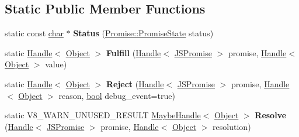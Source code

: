\subsection*{Static Public Member Functions}
\begin{DoxyCompactItemize}
\item 
\mbox{\label{classv8_1_1internal_1_1JSPromise_a06fe1942f92d4b54d2e3625027102922}} 
static const \mbox{\hyperlink{classchar}{char}} $\ast$ {\bfseries Status} (\mbox{\hyperlink{classv8_1_1Promise_a0c357b9d99a634f98a5a203b0a322544}{Promise\+::\+Promise\+State}} status)
\item 
\mbox{\label{classv8_1_1internal_1_1JSPromise_ae661a5f908aca0c05a78af29f0a615e0}} 
static \mbox{\hyperlink{classv8_1_1internal_1_1Handle}{Handle}}$<$ \mbox{\hyperlink{classv8_1_1internal_1_1Object}{Object}} $>$ {\bfseries Fulfill} (\mbox{\hyperlink{classv8_1_1internal_1_1Handle}{Handle}}$<$ \mbox{\hyperlink{classv8_1_1internal_1_1JSPromise}{J\+S\+Promise}} $>$ promise, \mbox{\hyperlink{classv8_1_1internal_1_1Handle}{Handle}}$<$ \mbox{\hyperlink{classv8_1_1internal_1_1Object}{Object}} $>$ value)
\item 
\mbox{\label{classv8_1_1internal_1_1JSPromise_afeb5e08b50e9b3d85ec5ae121b7fcd6e}} 
static \mbox{\hyperlink{classv8_1_1internal_1_1Handle}{Handle}}$<$ \mbox{\hyperlink{classv8_1_1internal_1_1Object}{Object}} $>$ {\bfseries Reject} (\mbox{\hyperlink{classv8_1_1internal_1_1Handle}{Handle}}$<$ \mbox{\hyperlink{classv8_1_1internal_1_1JSPromise}{J\+S\+Promise}} $>$ promise, \mbox{\hyperlink{classv8_1_1internal_1_1Handle}{Handle}}$<$ \mbox{\hyperlink{classv8_1_1internal_1_1Object}{Object}} $>$ reason, \mbox{\hyperlink{classbool}{bool}} debug\+\_\+event=true)
\item 
\mbox{\label{classv8_1_1internal_1_1JSPromise_a3058539c56a4f4709b81604fafc03705}} 
static V8\+\_\+\+W\+A\+R\+N\+\_\+\+U\+N\+U\+S\+E\+D\+\_\+\+R\+E\+S\+U\+LT \mbox{\hyperlink{classv8_1_1internal_1_1MaybeHandle}{Maybe\+Handle}}$<$ \mbox{\hyperlink{classv8_1_1internal_1_1Object}{Object}} $>$ {\bfseries Resolve} (\mbox{\hyperlink{classv8_1_1internal_1_1Handle}{Handle}}$<$ \mbox{\hyperlink{classv8_1_1internal_1_1JSPromise}{J\+S\+Promise}} $>$ promise, \mbox{\hyperlink{classv8_1_1internal_1_1Handle}{Handle}}$<$ \mbox{\hyperlink{classv8_1_1internal_1_1Object}{Object}} $>$ resolution)
\end{DoxyCompactItemize}
